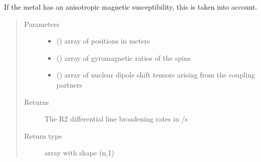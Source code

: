 \documentclass[a4paper,10pt,english,openany,oneside]{sphinxmanual}
\begin{document}
\begin{fulllineitems}
\begin{fulllineitems}
\begin{fulllineitems}
If the metal has an anisotropic magnetic susceptibility, this is
taken into account.
\begin{quote}\begin{description}
\item[{Parameters}] \leavevmode\begin{itemize}
\item {} 
 (\sphinxstyleliteralemphasis{\sphinxupquote{ (}}\sphinxstyleliteralemphasis{\sphinxupquote{,}}\sphinxstyleliteralemphasis{\sphinxupquote{)}}) \textendash{} array of positions in meters

\item {} 
 (\sphinxstyleliteralemphasis{\sphinxupquote{ (}}\sphinxstyleliteralemphasis{\sphinxupquote{,}}\sphinxstyleliteralemphasis{\sphinxupquote{)}}) \textendash{} array of gyromagnetic ratios of the spins

\item {} 
 (\sphinxstyleliteralemphasis{\sphinxupquote{ (}}\sphinxstyleliteralemphasis{\sphinxupquote{,}}\sphinxstyleliteralemphasis{\sphinxupquote{,}}\sphinxstyleliteralemphasis{\sphinxupquote{)}}) \textendash{} array of nuclear dipole shift tensors arising from
the coupling partners

\end{itemize}

\item[{Returns}] \leavevmode
{} \textendash{} The R2 differential line broadening rates in /s

\item[{Return type}] \leavevmode
array with shape (n,1)

\end{description}\end{quote}

\end{fulllineitems}




\end{fulllineitems}
\end{fulllineitems}
\end{document}
